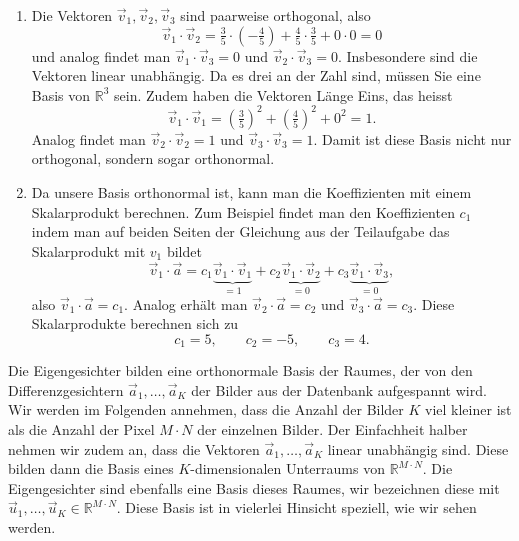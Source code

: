 \begin{losung*}
	\phantom{text}
	\begin{enumerate}[label=(\alph*)]
		\item Die Vektoren $\vec v_1,\vec v_2,\vec v_3$ sind paarweise orthogonal, also
		\begin{equation*}
			\vec v_1\cdot\vec v_2= \tfrac{3}{5}\cdot\left(-\tfrac{4}{5}\right)+\tfrac{4}{5}\cdot\tfrac{3}{5}+0\cdot 0=0
		\end{equation*}
		und analog findet man $\vec v_1\cdot\vec v_3=0$ und $\vec v_2\cdot\vec v_3=0$.
		Insbesondere sind die Vektoren linear unabhängig.
		Da es drei an der Zahl sind, müssen Sie eine Basis von $\mathbb R^3$ sein.
		Zudem haben die Vektoren Länge Eins, das heisst
		\begin{equation*}
			\vec v_1\cdot\vec v_1= \left(\tfrac{3}{5}\right)^2+\left(\tfrac{4}{5}\right)^2+0^2=1.
		\end{equation*}
		Analog findet man $\vec v_2\cdot\vec v_2=1$ und $\vec v_3\cdot\vec v_3=1$.
		Damit ist diese Basis nicht nur orthogonal, sondern sogar orthonormal.
		\item Da unsere Basis orthonormal ist, kann man die Koeffizienten mit einem Skalarprodukt berechnen.
		Zum Beispiel findet man den Koeffizienten $c_1$ indem man auf beiden Seiten der Gleichung aus der Teilaufgabe das Skalarprodukt mit $v_1$ bildet
		\begin{equation*}
			\vec v_1\cdot\vec a=c_1\underbrace{\vec v_1\cdot\vec v_1}_{=1}+c_2\underbrace{\vec v_1\cdot\vec v_2}_{=0}+c_3\underbrace{\vec v_1\cdot\vec v_3}_{=0},
		\end{equation*}
		also $\vec v_1\cdot\vec a=c_1$.
		Analog erhält man $\vec v_2\cdot\vec a=c_2$ und $\vec v_3\cdot\vec a=c_3$.
		Diese Skalarprodukte berechnen sich zu
		\begin{equation*}
			c_1=5,\quad\quad c_2=-5,\quad\quad c_3=4.
		\end{equation*}
	\end{enumerate}
\end{losung*}

Die Eigengesichter bilden eine orthonormale Basis der Raumes, der von den Differenzgesichtern $\vec a_1,\ldots,\vec a_K$ der Bilder aus der Datenbank aufgespannt wird.
Wir werden im Folgenden annehmen, dass die Anzahl der Bilder $K$ viel kleiner ist als die Anzahl der Pixel $M\cdot N$ der einzelnen Bilder.
Der Einfachheit halber nehmen wir zudem an, dass die Vektoren $\vec a_1,\ldots,\vec a_K$ linear unabhängig sind.
Diese bilden dann die Basis eines $K$-dimensionalen Unterraums von $\mathbb R^{M\cdot N}$.
Die Eigengesichter sind ebenfalls eine Basis dieses Raumes, wir bezeichnen diese mit $\vec u_1,\dots,\vec u_K\in\mathbb R^{M\cdot N}$.
Diese Basis ist in vielerlei Hinsicht speziell, wie wir sehen werden.

